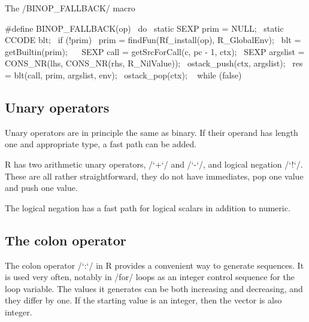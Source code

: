 \begin{listing}[htbp]
  \caption{\label{lst:eq3}The \cinline/BINOP_FALLBACK/ macro}
  \begin{ccode}
#define BINOP_FALLBACK(op)                                            \
do {                                                                  \
  static SEXP prim = NULL;                                            \
  static CCODE blt;                                                   \
  if (!prim) {                                                        \
    prim = findFun(Rf_install(op), R_GlobalEnv);                      \
    blt = getBuiltin(prim);                                           \
  }                                                                   \
  SEXP call = getSrcForCall(c, pc - 1, ctx);                          \
  SEXP argslist = CONS_NR(lhs, CONS_NR(rhs, R_NilValue));             \
  ostack_push(ctx, argslist);                                         \
  res = blt(call, prim, argslist, env);                               \
  ostack_pop(ctx);                                                    \
} while (false)
  \end{ccode}
\end{listing}


\subsection{Unary operators}

Unary operators are in principle the same as binary. If their operand has length one and appropriate type, a fast path can be added.

R has two arithmetic unary operators, \rinline/`+`/ and \rinline/`-`/, and logical negation \rinline/`!`/. These are all rather straightforward, they do not have immediates, pop one value and push one value.

The logical negation has a fast path for logical scalars in addition to numeric.


\subsection{The colon operator}

The colon operator \rinline/`:`/ in R provides a convenient way to generate sequences. It is used very often, notably in \rinline/for/ loops as an integer control sequence for the loop variable. The values it generates can be both increasing and decreasing, and they differ by one. If the starting value is an integer, then the vector is also integer.

